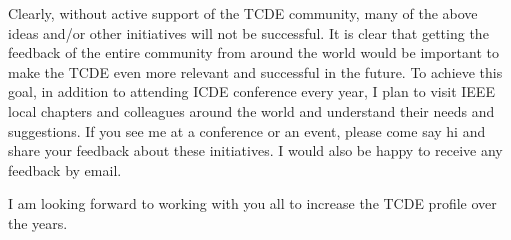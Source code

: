 \documentclass{article}
\begin{document}
Clearly, without active support of the TCDE community, many of the above ideas and/or other initiatives will not be successful. It is clear that getting the feedback of the entire community from around the world would be important to make the TCDE even more relevant and successful in the future. To achieve this goal, in addition to attending ICDE conference every year, I plan to visit IEEE local chapters and colleagues around the world and understand their needs and suggestions. If you see me at a conference or an event, please come say hi and share your feedback about these initiatives.  I would also be happy to receive any feedback by email.

I am looking forward to working with you all to increase the TCDE profile over the years.
\end{document}
